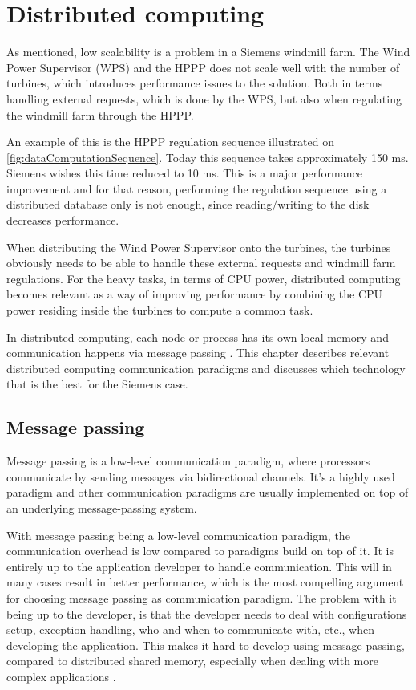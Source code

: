 \chapter{Distributed computing}
As mentioned, low scalability is a problem in a Siemens windmill farm. The Wind Power Supervisor (WPS) and the HPPP does not scale well with the number of turbines, which introduces performance issues to the solution. Both in terms handling external requests, which is done by the WPS, but also when regulating the windmill farm through the HPPP. 

An example of this is the HPPP regulation sequence illustrated on \cref{fig:dataComputationSequence}. Today this sequence takes approximately 150 ms. Siemens wishes this time reduced to 10 ms. This is a major performance improvement and for that reason, performing the regulation sequence using a distributed database only is not enough, since reading/writing to the disk decreases performance.

When distributing the Wind Power Supervisor onto the turbines, the turbines obviously needs to be able to handle these external requests and windmill farm regulations. For the heavy tasks, in terms of CPU power, distributed computing becomes relevant as a way of improving performance by combining the CPU power residing inside the turbines to compute a common task.

In distributed computing, each node or process has its own local memory and communication happens via message passing \cite{andrews2000foundations}. This chapter describes relevant distributed computing communication paradigms and discusses which technology that is the best for the Siemens case. 


\section{Message passing}

Message passing is a low-level communication paradigm, where processors communicate by sending messages via bidirectional channels. It's a highly used paradigm and other communication paradigms are usually implemented on top of an underlying message-passing system.  

With message passing being a low-level communication paradigm, the communication overhead is low compared to paradigms build on top of it. It is entirely up to the application developer to handle communication. This will in many cases result in better performance, which is the most compelling argument for choosing message passing as communication paradigm. The problem with it being up to the developer, is that the developer needs to deal with configurations setup, exception handling, who and when to communicate with, etc., when developing the application. This makes it hard to develop using message passing, compared to distributed shared memory, especially when dealing with more complex applications \cite{lu1995message}. 

